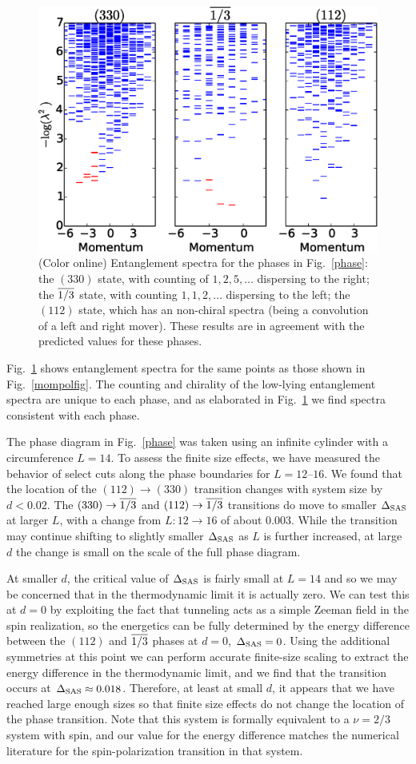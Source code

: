 \begin{figure}[t]
	\includegraphics[width=0.6\linewidth]{figures/abelian_spectra.eps}
	\caption{(Color online)
		Entanglement spectra for the phases in Fig.~\ref{phase}:
		the $(330)$ state, with counting of $1,2,5,\dots$  dispersing to the right;
		the $\overline{1/3}$ state,  with  counting $1,1,2,\dots$ dispersing to the left;
		the $(112)$ state, which has an non-chiral spectra (being a convolution of a left and right mover).
		These results are in agreement with the predicted values for these phases.
	}
	\label{spectra}
\end{figure}
Fig.~\ref{spectra} shows entanglement spectra for the same points as those shown in Fig.~\ref{mompolfig}.
The counting and chirality of the low-lying entanglement spectra are unique to each phase, and as elaborated in Fig.~\ref{spectra} we find spectra consistent with each phase.


The phase diagram in Fig.~\ref{phase} was taken using an infinite cylinder with a circumference $L=14$. 
To assess the finite size effects, we have measured the behavior of select cuts along the phase boundaries for $L=12\mbox{--}16$.
We found that the location of the $(112)\rightarrow(330)$ transition changes with system size by $d<0.02$.
The $(330) \to \overline{1/3}$ and $(112) \to \overline{1/3}$ transitions do move to smaller $\Delta_\textrm{SAS}$ at larger $L$,  with a change from $L: 12 \to 16$ of about $0.003$.
While the transition may continue shifting to slightly smaller $\Delta_\textrm{SAS}$ as $L$ is further increased, at large $d$ the change is small on the scale of the full phase diagram. 

At smaller $d$, the critical value of $\Delta_\textrm{SAS}$ is fairly small at $L=14$ and so we may be concerned that in the thermodynamic limit it is actually zero.
We can test this at $d = 0$ by exploiting the fact that tunneling acts as a simple Zeeman field in the spin realization, so the energetics can be fully determined by the energy difference between the $(112)$ and $\overline{1/3}$ phases at $d=0$, $\Delta_\textrm{SAS}=0$. 
Using the additional symmetries at this point we can perform accurate finite-size scaling to extract the energy difference in the thermodynamic limit, and we find that the transition occurs at $\Delta_\textrm{SAS}\approx0.018$.
Therefore, at least at small $d$, it appears that we have reached large enough sizes so that finite size effects do not change the location of the phase transition. Note that this system is formally equivalent to a $\nu=2/3$ system with spin, and our value for the energy difference matches the numerical literature for the spin-polarization transition in that system.\cite{spinpolED}


